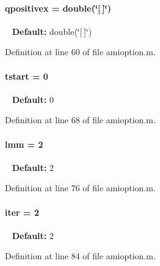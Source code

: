 \paragraph[{qpositivex}]{\setlength{\rightskip}{0pt plus 5cm}qpositivex = double(\char`\"{}\mbox{[}$\,$\mbox{]}\char`\"{})}\label{classamioption_a8938c19fd7067f4780be8255764210b7}
~\newline
{\bfseries Default\+:} double(\char`\"{}\mbox{[}$\,$\mbox{]}\char`\"{}) 

Definition at line 60 of file amioption.\+m.

\hypertarget{classamioption_a18a69d8713604897ca9ee705d9d4fc4a}{}
\paragraph[{tstart}]{\setlength{\rightskip}{0pt plus 5cm}tstart = 0}\label{classamioption_a18a69d8713604897ca9ee705d9d4fc4a}
~\newline
{\bfseries Default\+:} 0 

Definition at line 68 of file amioption.\+m.

\hypertarget{classamioption_a6f4b21b13e0c8c531c452c70b43fc96a}{}
\paragraph[{lmm}]{\setlength{\rightskip}{0pt plus 5cm}lmm = 2}\label{classamioption_a6f4b21b13e0c8c531c452c70b43fc96a}
~\newline
{\bfseries Default\+:} 2 

Definition at line 76 of file amioption.\+m.

\hypertarget{classamioption_a1fc3ae6bd5c6a80e9b81b27fc7b7a11a}{}
\paragraph[{iter}]{\setlength{\rightskip}{0pt plus 5cm}iter = 2}\label{classamioption_a1fc3ae6bd5c6a80e9b81b27fc7b7a11a}
~\newline
{\bfseries Default\+:} 2 

Definition at line 84 of file amioption.\+m.

\hypertarget{classamioption_a06749b49eaa313f4d00f0115d3a7a7f3}{}
